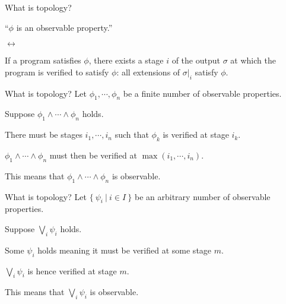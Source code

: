 \documentclass[xcolor={dvipsnames}]{beamer}
\begin{document}
\begin{frame}{What is topology?}
  \large
  \begin{center}
    ``$\phi$ is an \alert{observable property}.''

    \vspace{0.5em}
    $\leftrightarrow$
    \vspace{0.5em}

    If a program satisfies $\phi$, there exists a stage $i$ of the output $\sigma$ at which the
    program is \alert{verified} to satisfy $\phi$: all extensions of $\sigma|_i$ satisfy $\phi$.
  \end{center}
\end{frame}

\begin{frame}{What is topology?}
  Let $\phi_1, \cdots ,\phi_n$ be a \alert{finite} number of observable properties.

  \vspace{1em}

  Suppose $\phi_1 \wedge \cdots \wedge \phi_n$ holds.

  \vspace{1em}

  There must be \alert{stages} $i_1, \cdots , i_n$ such that $\phi_k$ is verified at stage $i_k$.

  \vspace{1em}

  $\phi_1 \wedge \cdots \wedge \phi_n$ must then be verified at $\max(i_1, \cdots, i_n)$.

  \vspace{1em}

  This means that $\phi_1 \wedge \cdots \wedge \phi_n$ is \alert{observable}.
\end{frame}

\begin{frame}{What is topology?}
    Let $\{~\psi_i ~|~ i \in I~\}$ be an \alert{arbitrary} number of observable properties.

    \vspace{1em}

    Suppose $\bigvee_i \psi_i$ holds.

    \vspace{1em}

    Some $\psi_i$ holds meaning it must be verified at some stage $m$.

    \vspace{1em}

    $\bigvee_i \psi_i$ is hence verified at stage $m$.

    \vspace{1em}

    This means that $\bigvee_i \psi_i$ is \alert{observable}.
\end{frame}
\end{document}

